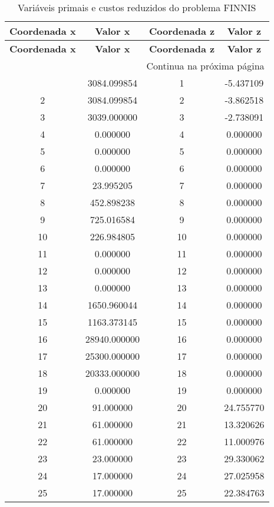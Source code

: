 \documentclass[12pt]{article}
\begin{document}
\begin{longtable}{@{}cccc@{}}
\caption{Variáveis primais e custos reduzidos do problema FINNIS} \\
\toprule
\textbf{Coordenada x} & \textbf{Valor x} & \textbf{Coordenada z} & \textbf{Valor z} \\
\midrule
\endfirsthead

\toprule
\textbf{Coordenada x} & \textbf{Valor x} & \textbf{Coordenada z} & \textbf{Valor z} \\
\midrule
\endhead

\midrule \multicolumn{4}{r}{{Continua na próxima página}} \\ \midrule
\endfoot

\bottomrule
\endlastfoot
1 & 3084.099854 & 1 & -5.437109 \\
2 & 3084.099854 & 2 & -3.862518 \\
3 & 3039.000000 & 3 & -2.738091 \\
4 & 0.000000 & 4 & 0.000000 \\
5 & 0.000000 & 5 & 0.000000 \\
6 & 0.000000 & 6 & 0.000000 \\
7 & 23.995205 & 7 & 0.000000 \\
8 & 452.898238 & 8 & 0.000000 \\
9 & 725.016584 & 9 & 0.000000 \\
10 & 226.984805 & 10 & 0.000000 \\
11 & 0.000000 & 11 & 0.000000 \\
12 & 0.000000 & 12 & 0.000000 \\
13 & 0.000000 & 13 & 0.000000 \\
14 & 1650.960044 & 14 & 0.000000 \\
15 & 1163.373145 & 15 & 0.000000 \\
16 & 28940.000000 & 16 & 0.000000 \\
17 & 25300.000000 & 17 & 0.000000 \\
18 & 20333.000000 & 18 & 0.000000 \\
19 & 0.000000 & 19 & 0.000000 \\
20 & 91.000000 & 20 & 24.755770 \\
21 & 61.000000 & 21 & 13.320626 \\
22 & 61.000000 & 22 & 11.000976 \\
23 & 23.000000 & 23 & 29.330062 \\
24 & 17.000000 & 24 & 27.025958 \\
25 & 17.000000 & 25 & 22.384763 \\

\end{longtable}
\end{document}
